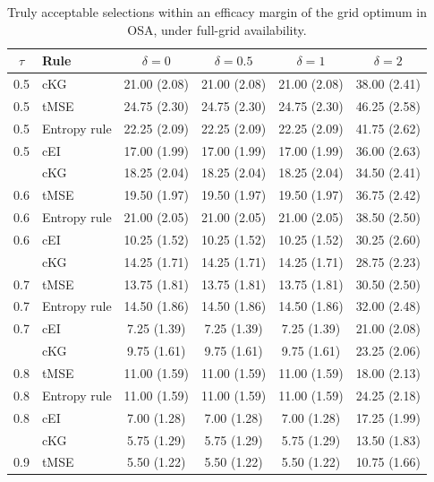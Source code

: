 \documentclass[11pt]{article}
\newcommand{\revisioncolor}{}
\begin{document}
\begin{table}[H]
\revisioncolor
\centering
\footnotesize
\setlength{\tabcolsep}{5pt}
\caption{Truly acceptable selections within an efficacy margin of the grid optimum in OSA, under full-grid availability.}
\label{tab:nearoptimal}
\begin{tabular}{@{}clcccc@{}}
\toprule
$\tau$ & Rule & $\delta=0$ & $\delta=0.5$ & $\delta=1$ & $\delta=2$ \\
\midrule
0.5 & cKG & 21.00 (2.08) & 21.00 (2.08) & 21.00 (2.08) & 38.00 (2.41) \\
0.5 & tMSE & 24.75 (2.30) & 24.75 (2.30) & 24.75 (2.30) & 46.25 (2.58) \\
0.5 & Entropy rule & 22.25 (2.09) & 22.25 (2.09) & 22.25 (2.09) & 41.75 (2.62) \\
0.5 & cEI & 17.00 (1.99) & 17.00 (1.99) & 17.00 (1.99) & 36.00 (2.63) \\
\addlinespace[2pt]
0.6 & cKG & 18.25 (2.04) & 18.25 (2.04) & 18.25 (2.04) & 34.50 (2.41) \\
0.6 & tMSE & 19.50 (1.97) & 19.50 (1.97) & 19.50 (1.97) & 36.75 (2.42) \\
0.6 & Entropy rule & 21.00 (2.05) & 21.00 (2.05) & 21.00 (2.05) & 38.50 (2.50) \\
0.6 & cEI & 10.25 (1.52) & 10.25 (1.52) & 10.25 (1.52) & 30.25 (2.60) \\
\addlinespace[2pt]
0.7 & cKG & 14.25 (1.71) & 14.25 (1.71) & 14.25 (1.71) & 28.75 (2.23) \\
0.7 & tMSE & 13.75 (1.81) & 13.75 (1.81) & 13.75 (1.81) & 30.50 (2.50) \\
0.7 & Entropy rule & 14.50 (1.86) & 14.50 (1.86) & 14.50 (1.86) & 32.00 (2.48) \\
0.7 & cEI & 7.25 (1.39) & 7.25 (1.39) & 7.25 (1.39) & 21.00 (2.08) \\
\addlinespace[2pt]
0.8 & cKG & 9.75 (1.61) & 9.75 (1.61) & 9.75 (1.61) & 23.25 (2.06) \\
0.8 & tMSE & 11.00 (1.59) & 11.00 (1.59) & 11.00 (1.59) & 18.00 (2.13) \\
0.8 & Entropy rule & 11.00 (1.59) & 11.00 (1.59) & 11.00 (1.59) & 24.25 (2.18) \\
0.8 & cEI & 7.00 (1.28) & 7.00 (1.28) & 7.00 (1.28) & 17.25 (1.99) \\
\addlinespace[2pt]
0.9 & cKG & 5.75 (1.29) & 5.75 (1.29) & 5.75 (1.29) & 13.50 (1.83) \\
0.9 & tMSE & 5.50 (1.22) & 5.50 (1.22) & 5.50 (1.22) & 10.75 (1.66) \\

\end{tabular}
\end{table}
\end{document}

